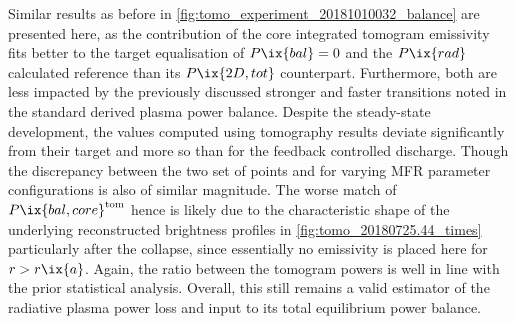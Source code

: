                     Similar results as before in \cref{fig:tomo_experiment_20181010032_balance} are presented here, as the contribution of the core integrated tomogram emissivity fits better to the target equalisation of $P\ix{bal}=0$ and the $P\ix{rad}$ calculated reference than its $P\ix{2D,tot}$ counterpart. Furthermore, both are less impacted by the previously discussed stronger and faster transitions noted in the standard derived plasma power balance. Despite the steady-state development, the values computed using tomography results deviate significantly from their target and more so than for the feedback controlled discharge. Though the discrepancy between the two set of points and for varying MFR parameter configurations is also of similar magnitude. The worse match of $P\ix{bal,core}^{\text{tom}}$ hence is likely due to the characteristic shape of the underlying reconstructed brightness profiles in \cref{fig:tomo_20180725.44_times} particularly after the collapse, since essentially no emissivity is placed here for $r>r\ix{a}$. Again, the ratio between the tomogram powers is well in line with the prior statistical analysis. Overall, this still remains a valid estimator of the radiative plasma power loss and input to its total equilibrium power balance.\\%
%
